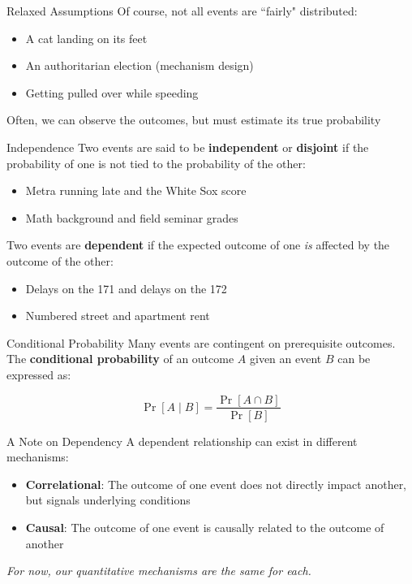 \documentclass[10pt]{beamer}
\begin{document}
\begin{frame}{Relaxed Assumptions}
    Of course, not all events are ``fairly" distributed:

    \begin{itemize}
        \item A cat landing on its feet
        \item An authoritarian election (mechanism design)
        \item Getting pulled over while speeding
    \end{itemize}

    Often, we can observe the outcomes, but must estimate its true probability
\end{frame}


\begin{frame}{Independence}
    Two events are said to be \textbf{independent} or \textbf{disjoint} if the probability of one is not tied to the probability of the other:

    \begin{itemize}
        \item Metra running late and the White Sox score
        \item Math background and field seminar grades
    \end{itemize}
\pause
    Two events are \textbf{dependent} if the expected outcome of one \textit{is} affected by the outcome of the other:

    \begin{itemize}
        \item Delays on the 171 and delays on the 172
        \item Numbered street and apartment rent
    \end{itemize}
\end{frame}

\begin{frame}{Conditional Probability}
    Many events are contingent on prerequisite outcomes. The \textbf{conditional probability} of an outcome $A$ given an event $B$ can be expressed as:

    \[\Pr[A \; | \; B] = \frac{\Pr[ A \cap B]}{\Pr[B]}\]
\end{frame}

\begin{frame}{A Note on Dependency}
    A dependent relationship can exist in different mechanisms:

    \begin{itemize}
        \item \textbf{Correlational}: The outcome of one event does not directly impact another, but signals underlying conditions
        \item \textbf{Causal}: The outcome of one event is causally related to the outcome of another
    \end{itemize}

    \textit{For now, our quantitative mechanisms are the same for each.}
\end{frame}
\end{document}
